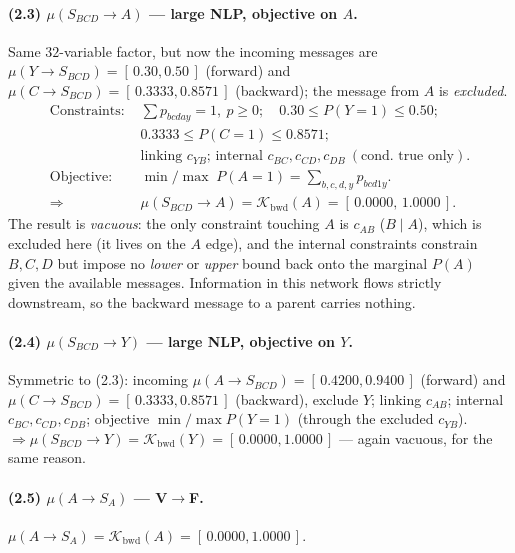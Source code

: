 \documentclass[11pt]{article}
\newcommand{\cK}{\mathcal{K}}
\newcommand{\bwd}{\mathrm{bwd}}
\begin{document}
\paragraph{(2.3) $\mu(S_{BCD}\!\to\!A)$ --- large NLP, objective on $A$.}
Same $32$-variable factor, but now the incoming messages are
$\mu(Y\!\to\!S_{BCD})=[\,0.30,0.50\,]$ (forward) and
$\mu(C\!\to\!S_{BCD})=[\,0.3333,0.8571\,]$ (backward); the message from
$A$ is \emph{excluded}.
\begin{align*}
  \text{Constraints: } & \textstyle\sum p_{bcday}=1,\ p\ge0;\quad
                          0.30\le P(Y{=}1)\le 0.50;\\
                       & 0.3333\le P(C{=}1)\le 0.8571;\\
                       & \text{linking } c_{YB}\text{; internal } c_{BC},c_{CD},c_{DB}\ (\text{cond.\ true only}).\\
  \text{Objective: } & \min/\max\; P(A{=}1)=\!\!\sum_{b,c,d,y}\!\!p_{bcd1y}.\\
  \Rightarrow\;& \mu(S_{BCD}\!\to\!A)=\cK_\bwd(A)=[\,0.0000,\,1.0000\,].
\end{align*}
The result is \emph{vacuous}: the only constraint touching $A$ is $c_{AB}$
($B\mid A$), which is excluded here (it lives on the $A$ edge), and the
internal constraints constrain $B,C,D$ but impose no \emph{lower} or
\emph{upper} bound back onto the marginal $P(A)$ given the available messages.
Information in this network flows strictly downstream, so the backward message
to a parent carries nothing.

\paragraph{(2.4) $\mu(S_{BCD}\!\to\!Y)$ --- large NLP, objective on $Y$.}
Symmetric to (2.3): incoming $\mu(A\!\to\!S_{BCD})=[\,0.4200,0.9400\,]$
(forward) and $\mu(C\!\to\!S_{BCD})=[\,0.3333,0.8571\,]$ (backward), exclude
$Y$; linking $c_{AB}$; internal $c_{BC},c_{CD},c_{DB}$; objective
$\min/\max P(Y{=}1)$ (through the excluded $c_{YB}$). $\Rightarrow
\mu(S_{BCD}\!\to\!Y)=\cK_\bwd(Y)=[\,0.0000,1.0000\,]$ --- again vacuous, for the
same reason.

\paragraph{(2.5) $\mu(A\!\to\!S_A)$ --- V$\to$F.}
$\mu(A\!\to\!S_A)=\cK_\bwd(A)=[\,0.0000,1.0000\,]$.
\end{document}
